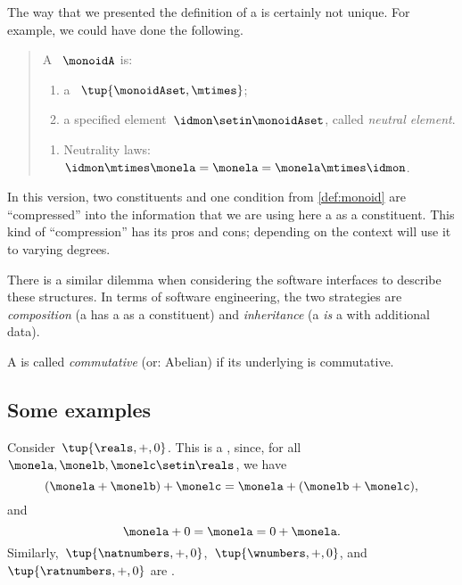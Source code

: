 \begin{remark}
    The way that we presented the definition of a  is certainly not unique.
    For example, we could have done the following.
    \begin{quote}
        A ~$\monoidA$ is:
        \begin{body}
            \constit
            \begin{enumerate}
                \item a ~$\tup{\monoidAset, \mtimes}$;
                \item a specified element~$\idmon\setin \monoidAset$, called \emph{neutral element}.
            \end{enumerate}
            \condit
            \begin{enumerate}
                \item Neutrality laws:~$\idmon\mtimes \monela= \monela= \monela \mtimes \idmon$.
            \end{enumerate}
        \end{body}
    \end{quote}
    In this version, two constituents and one condition from \cref{def:monoid} are ``compressed'' into the information that we are using here a  as a constituent.
    This kind of ``compression'' has its pros and cons; depending on the context will use it to varying degrees.

    There is a similar dilemma when considering the software interfaces to describe these structures.
    In terms of software engineering, the two strategies are \emph{composition} (a  has a  as a constituent) and \emph{inheritance} (a  \emph{is} a  with additional data).

\end{remark}

\begin{remark}
    A  is called \emph{commutative} (or: Abelian) if its underlying  is commutative.
\end{remark}

\subsection{Some examples}

\begin{example}
    Consider~$\tup{\reals,{{+}},0}$.
    This is a , since, for all~$\monela,\monelb, \monelc \setin \reals$, we have
    \begin{equation}
        (\monela+\monelb)
        +\monelc=\monela+(\monelb+\monelc),
    \end{equation}
    and
    \begin{equation}
        \monela+0=\monela=0+\monela.
    \end{equation}
    Similarly,~$\tup{\natnumbers, {{+}},0}$,~$\tup{\wnumbers, {{+}},0}$, and~$\tup{\ratnumbers, {{+}},0}$ are .
\end{example}

